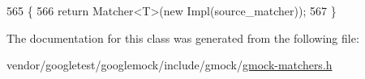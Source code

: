 \begin{DoxyCode}
565                                                            \{
566     \textcolor{keywordflow}{return} Matcher<T>(\textcolor{keyword}{new} Impl(source\_matcher));
567   \}
\end{DoxyCode}


The documentation for this class was generated from the following file\+:\begin{DoxyCompactItemize}
\item 
vendor/googletest/googlemock/include/gmock/\hyperlink{gmock-matchers_8h}{gmock-\/matchers.\+h}\end{DoxyCompactItemize}
